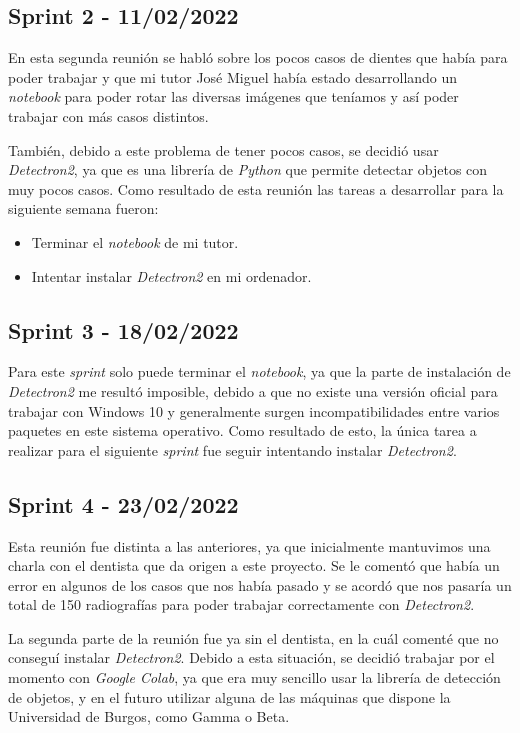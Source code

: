 \subsection{Sprint 2 - 11/02/2022}
En esta segunda reunión se habló sobre los pocos casos de dientes que había para poder trabajar y que mi tutor José Miguel había estado desarrollando un \emph{notebook} para poder rotar las diversas imágenes que teníamos y así poder trabajar con más casos distintos. 

También, debido a este problema de tener pocos casos, se decidió usar \emph{Detectron2}, ya que es una librería de \emph{Python} que permite detectar objetos con muy pocos casos.
Como resultado de esta reunión las tareas a desarrollar para la siguiente semana fueron:
\begin{itemize}
    \item Terminar el \emph{notebook} de mi tutor.
    \item Intentar instalar \emph{Detectron2} en mi ordenador.
\end{itemize}
\subsection{Sprint 3 - 18/02/2022}
Para este \emph{sprint} solo puede terminar el \emph{notebook}, ya que la parte de instalación de \emph{Detectron2} me resultó imposible, debido a que no existe una versión oficial para trabajar con Windows 10 y generalmente surgen incompatibilidades entre varios paquetes en este sistema operativo. Como resultado de esto, la única tarea a realizar para el siguiente \emph{sprint} fue seguir intentando instalar \emph{Detectron2}.
\subsection{Sprint 4 - 23/02/2022}
Esta reunión fue distinta a las anteriores, ya que inicialmente mantuvimos una charla con el dentista que da origen a este proyecto. Se le comentó que había un error en algunos de los casos que nos había pasado y se acordó que nos pasaría un total de 150 radiografías para poder trabajar correctamente con \emph{Detectron2}.

La segunda parte de la reunión fue ya sin el dentista, en la cuál comenté que no conseguí instalar \emph{Detectron2}. Debido a esta situación, se decidió trabajar por el momento con \emph{Google Colab}, ya que era muy sencillo usar la librería de detección de objetos, y en el futuro utilizar alguna de las máquinas que dispone la Universidad de Burgos, como Gamma o Beta. 


